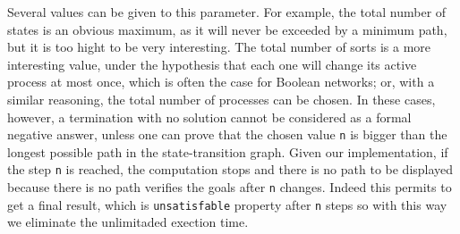 Several values can be given to this parameter.
For example, the total number of states is an obvious maximum,
as it will never be exceeded by a minimum path,
but it is too hight to be very interesting.
The total number of sorts is a more interesting value,
under the hypothesis that each one will change its active process at most once,
which is often the case for Boolean networks;
or, with a similar reasoning, the total number of processes can be chosen.
In these cases, however, a termination with no solution cannot be considered as a formal
negative answer, unless one can prove that the chosen value \texttt{n}
is bigger than the longest possible path in the state-transition graph.
Given our implementation, if the step \texttt{n} is reached,
the computation stops and there is no path to be displayed because there is no path verifies the goals after \texttt{n} changes. Indeed this permits to get a final result, which is \texttt{unsatisfable} property after \texttt{n} steps so with this way we eliminate the unlimitaded exection time.
